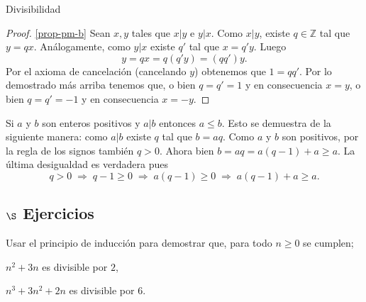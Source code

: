 \begin{section}{Divisibilidad}
\begin{proof}
\vskip 0.1cm

\noindent \ref{prop-pm-b} Sean $x,y$ tales que  $x|y$ e $y|x$. Como $x|y$, existe $q \in \mathbb Z$ tal que $y = qx$. Análogamente, como $y|x$ existe $q'$ tal que $x = q'y$. Luego
$$y = qx = q(q'y) = (qq')y.$$
Por el axioma de cancelación (cancelando $y$) obtenemos que $1 = qq'$. Por lo demostrado más arriba tenemos que, o bien $q=q'=1$ y en consecuencia $x=y$, o bien $q=q'=-1$ y en consecuencia $x=-y$. 
\end{proof}

\begin{observacion*}
    Si $a$ y $b$ son enteros positivos y $a|b$  entonces $a \le b$. Esto se demuestra de la siguiente manera: como $a|b$  existe $q$  tal que $b = aq$. Como $a$ y $b$ son positivos, por la regla de los signos  también $q >0$. Ahora bien $b = aq = a(q-1) + a \ge a$. La última desigualdad es verdadera pues 
    $$q >0 \; \Rightarrow  \; q-1 \ge 0\; \Rightarrow \; a(q-1) \ge 0 \; \Rightarrow \; a(q-1) + a \ge a .
    $$ 
\end{observacion*}

\subsection*{$\S$ Ejercicios}
\begin{enumex}
    \item Usar el principio de inducción para demostrar que, para todo $n\ge0$ 
    se cumplen;
    \begin{enumex}
        \item $n^2+3n$ es divisible por $2$,
        
        \item $n^3+3n^2+2n$ es divisible por $6$. 
    \end{enumex}
\end{enumex}

\end{section}


